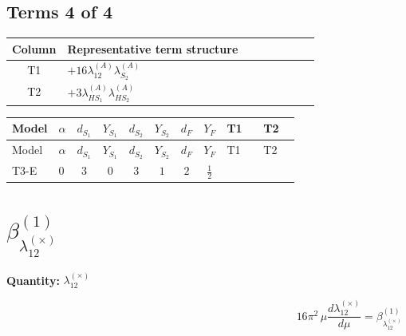 \documentclass[8pt]{article}
\begin{document}
\begin{landscape}
\subsection*{Terms 4 of 4}
\begin{center}
\begin{tabular}{@{}c >{\raggedright\arraybackslash}p{0.82\linewidth}@{}}
\toprule
Column & Representative term structure \\
\midrule
T1 & \(\displaystyle +16 {\lambda_{12}^{(A)}} {\lambda_{S_2}^{(A)}}\) \\
\midrule
T2 & \(\displaystyle +3 {\lambda_{HS_1}^{(A)}} {\lambda_{HS_2}^{(A)}}\) \\
\midrule
\bottomrule
\end{tabular}
\end{center}
\smallskip
\tiny
\begin{longtable}{@{}llcccccc >{\raggedright\arraybackslash}p{0.21\linewidth} >{\raggedright\arraybackslash}p{0.21\linewidth}@{}}
\toprule
Model & $\alpha$ & $d_{S_1}$ & $Y_{S_1}$ & $d_{S_2}$ & $Y_{S_2}$ & $d_F$ & $Y_F$ & T1 & T2 \\
\midrule
\endfirsthead
\toprule
Model & $\alpha$ & $d_{S_1}$ & $Y_{S_1}$ & $d_{S_2}$ & $Y_{S_2}$ & $d_F$ & $Y_F$ & T1 & T2 \\
\midrule
\endhead
T3-E & $0$ & $3$ & $0$ & $3$ & $1$ & $2$ & $\frac{1}{2}$ & \scriptsize\adjustbox{max width=\linewidth}{$\begin{gathered} +16 {\lambda_{12}^{(A)}} {\lambda_{S_2}^{(A)}}\end{gathered}$} & \scriptsize\adjustbox{max width=\linewidth}{$\begin{gathered} +3 {\lambda_{HS_1}^{(A)}} {\lambda_{HS_2}^{(A)}}\end{gathered}$} \\
\midrule
\bottomrule
\end{longtable}
\clearpage
\section*{$\beta_{\lambda_{12}^{(\times)}}^{(1)}$}
\noindent\textbf{Quantity: }$\lambda_{12}^{(\times)}$\par\smallskip
\[16\pi^2\,\mu\frac{d \lambda_{12}^{(\times)}}{d\mu}=\beta_{\lambda_{12}^{(\times)}}^{(1)}\]

\end{landscape}
\end{document}
